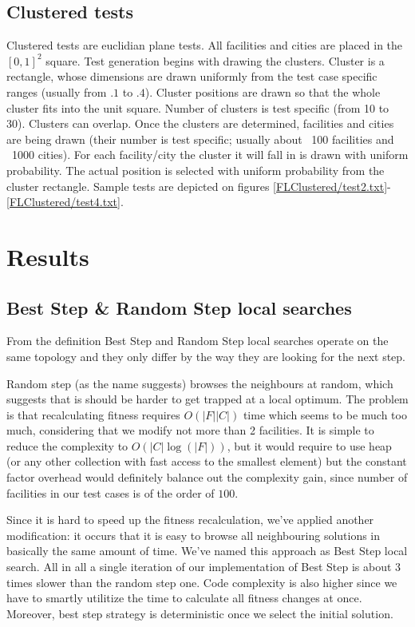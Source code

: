 \subsection{Clustered tests}

Clustered tests are euclidian plane tests.
All facilities and cities are placed in the $[0,1]^2$ square.
Test generation begins with drawing the clusters.
Cluster is a rectangle, whose dimensions are drawn uniformly from the test case specific ranges (usually from $.1$ to $.4$).
Cluster positions are drawn so that the whole cluster fits into the unit square.
Number of clusters is test specific (from 10 to 30). Clusters can overlap.
Once the clusters are determined, facilities and cities are being drawn (their number is test specific; usually about ~100 facilities and ~1000 cities).
For each facility/city the cluster it will fall in is drawn with uniform probability.
The actual position is selected with uniform probability from the cluster rectangle.
Sample tests are depicted on figures \ref{FLClustered/test2.txt}-\ref{FLClustered/test4.txt}.





\section{Results}

\subsection{Best Step \& Random Step local searches}

From the definition
Best Step and Random Step local searches operate on the same topology and
they only differ by the way they are looking for the next step.

Random step (as the name suggests) browses the neighbours at random,
which suggests that is should be harder to get trapped at a local optimum.
The problem is that recalculating fitness requires $O(|F||C|)$ time which
seems to be much too much, considering that we modify not more than 2 
facilities. It is simple to reduce the complexity to $O(|C|\log(|F|))$,
but it would require to use heap (or any other collection with fast access
to the smallest element) but the constant factor overhead would definitely
balance out the complexity gain, since number of facilities in our test
cases is of the order of $100$.

Since it is hard to speed up the fitness recalculation, we've applied
another modification: it occurs that it is easy to browse all neighbouring
solutions in basically the same amount of time. We've named this approach
as Best Step local search. All in all a single iteration of our implementation
of Best Step is about 3 times slower than the random step one.
Code complexity is also higher since we have to smartly utilitize the
time to calculate all fitness changes at once.
Moreover, best step strategy is deterministic once we select the initial
solution.

